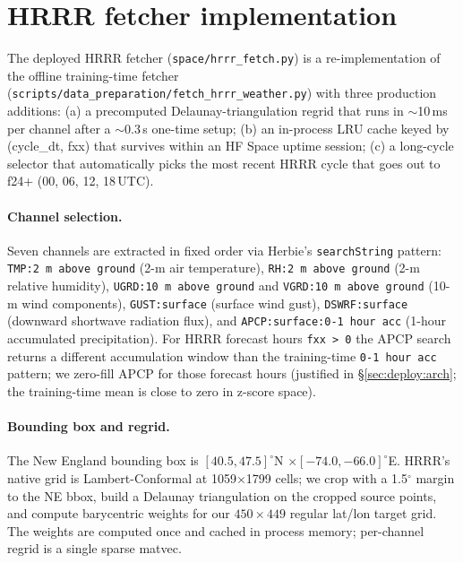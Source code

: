 
\section{HRRR fetcher implementation}
\label{app:hrrr}

The deployed HRRR fetcher (\texttt{space/hrrr\_fetch.py}) is a re-implementation of the offline training-time fetcher (\texttt{scripts/data\_preparation/fetch\_hrrr\_weather.py}) with three production additions: (a) a precomputed Delaunay-triangulation regrid that runs in $\sim$10\,ms per channel after a $\sim$0.3\,s one-time setup; (b) an in-process LRU cache keyed by (cycle\_dt, fxx) that survives within an HF Space uptime session; (c) a long-cycle selector that automatically picks the most recent HRRR cycle that goes out to f24+ (00, 06, 12, 18\,UTC).

\paragraph{Channel selection.} Seven channels are extracted in fixed order via Herbie's \texttt{searchString} pattern:
\texttt{TMP:2 m above ground} (2-m air temperature),
\texttt{RH:2 m above ground} (2-m relative humidity),
\texttt{UGRD:10 m above ground} and \texttt{VGRD:10 m above ground} (10-m wind components),
\texttt{GUST:surface} (surface wind gust),
\texttt{DSWRF:surface} (downward shortwave radiation flux),
and \texttt{APCP:surface:0-1 hour acc} (1-hour accumulated precipitation). For HRRR forecast hours \texttt{fxx > 0} the APCP search returns a different accumulation window than the training-time \texttt{0-1 hour acc} pattern; we zero-fill APCP for those forecast hours (justified in \S\ref{sec:deploy:arch}; the training-time mean is close to zero in z-score space).

\paragraph{Bounding box and regrid.} The New England bounding box is $[40.5,47.5]^{\circ}\!$N $\times [-74.0, -66.0]^{\circ}\!$E. HRRR's native grid is Lambert-Conformal at 1059$\times$1799 cells; we crop with a 1.5$^{\circ}$ margin to the NE bbox, build a Delaunay triangulation on the cropped source points, and compute barycentric weights for our $450\times 449$ regular lat/lon target grid. The weights are computed once and cached in process memory; per-channel regrid is a single sparse matvec.


